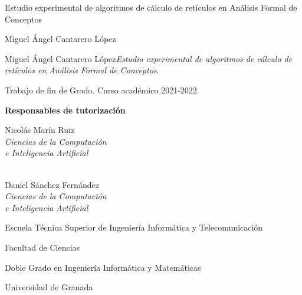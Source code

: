 

\newcommand{\miTitulo}{Estudio experimental de algoritmos de cálculo de retículos en Análisis Formal de Conceptos\xspace}
\newcommand{\miNombre}{Miguel Ángel Cantarero López\xspace}
\newcommand{\miGrado}{Doble Grado en Ingeniería Informática y Matemáticas}
\newcommand{\miFacultadC}{Facultad de Ciencias}
\newcommand{\miFacultadI}{Escuela Técnica Superior de Ingeniería Informática y Telecomunicación}
\newcommand{\miUniversidad}{Universidad de Granada}
\newcommand{\miTutorI}{
  Nicolás Marín Ruiz \\ \emph{Ciencias de la Computación}\\ \emph{e Inteligencia Artificial} 
}
\newcommand{\miTutorC}{
  Daniel Sánchez Fernández \\ \emph{Ciencias de la Computación}\\ \emph{e Inteligencia Artificial} 
}
\newcommand{\miCurso}{2021-2022\xspace}

\thispagestyle{empty}

\begin{center}
  \large


  \begingroup
  \huge{\miTitulo} \\ \bigskip
  \endgroup

  \textrm{\miNombre}


\end{center}

\newpage
\thispagestyle{empty}

\hfill

\vfill

\noindent\miNombre \textit{\miTitulo}.

Trabajo de fin de Grado. Curso académico \miCurso.

\begin{minipage}[t]{0.25\textwidth}
  \flushleft
  \textbf{Responsables de tutorización}
\end{minipage}
\begin{minipage}[t]{0.45\textwidth}
  \flushleft
  \miTutorI
  \medskip \\
  \miTutorC
\end{minipage}
\begin{minipage}[t]{0.30\textwidth}
  \flushright

  \miFacultadI
  \medskip

  \miFacultadC
  \medskip \medskip
  
  \miGrado
  \medskip
  
  \miUniversidad
\end{minipage}
\begin{flushleft}
\end{flushleft}

\endinput
